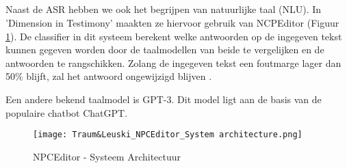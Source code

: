 \subsection{} \label{ssec:Natural Language Classifier}%

Naast de ASR hebben we ook het begrijpen van natuurlijke taal (NLU). In 'Dimension in Testimony' maakten ze hiervoor gebruik van NCPEditor (Figuur \ref{fig:NPCEArchitecture}). De classifier in dit systeem berekent welke antwoorden op de ingegeven tekst kunnen gegeven worden door de taalmodellen van beide te vergelijken en de antwoorden te rangschikken. Zolang de ingegeven tekst een foutmarge lager dan 50\% blijft, zal het antwoord ongewijzigd blijven \autocite{Leuski2010}.

Een andere bekend taalmodel is GPT-3. Dit model ligt aan de basis van de populaire chatbot ChatGPT.

\begin{figure}[h]
    \centering
    \texttt{[image: Traum\&Leuski\_NPCEditor\_System architecture.png]}
    \caption{NPCEditor - Systeem Architectuur \autocite{Leuski2010}}
    \label{fig:NPCEArchitecture}
\end{figure}
